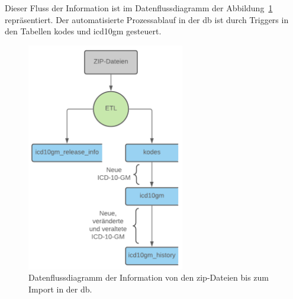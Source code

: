 Dieser Fluss der Information ist im Datenflussdiagramm der Abbildung~\ref{fig:dbflow} repräsentiert. Der automatisierte Prozessablauf in der \ac{db} ist durch Triggers in den Tabellen \glqq\textsf{kodes}\grqq{} und \glqq\textsf{icd10gm}\grqq{} gesteuert.

\begin{figure}[ht]
	\centering
	\includegraphics[height=10cm]{figures/dbflow}
	\caption[Datenfluss des Prozesses]{Datenflussdiagramm der Information von den \ac{zip}-Dateien bis zum Import in der \ac{db}.}
	\label{fig:dbflow}
\end{figure} 